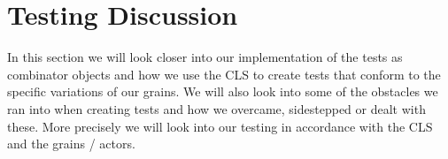 \section{Testing Discussion} \label{testingDisc}
In this section we will look closer into our implementation of the tests as combinator objects and how we use the CLS to create tests that conform to the specific variations of our grains. We will also look into some of the obstacles we ran into when creating tests and how we overcame, sidestepped or dealt with these. More precisely we will look into our testing in accordance with the CLS and the grains / actors.



